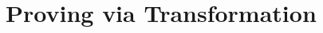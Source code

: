 
\chapter{Proving via Transformation}
\label{ch:proving-via-transformation}
\begin{comment}
We give details of the constructions and establish the soundness of
Algorithm~\ref{algorithm:overview}. Our goal is to establish the
following theorem:

\begin{theorem}
  Let $G^\fun{main} = \langle V, E, \cmd{cmd}^\fun{main} , \overline{\mathtt{u}}^\fun{main}, \overline{\mathtt{r}}^\fun{main},s,e \rangle$ be a control flow
  graph in $P$. If Algorithm~\ref{algorithm:overview} returns
  $\mathit{Pass}$, there is an inductive invariant $\Pi (G^\fun{main}, \TT)$
  such that $I_{\ell} \implies B_{\ell}$ for every $(\ell, \ell') \in
  E$ with $\cmd{cmd}^\fun{main} (\ell, \ell') = \mathtt{assert\ } B_{\ell}$.
  \label{theorem:soundness}
\end{theorem}
By Proposition~\ref{proposition:inductive-invariant}, it follows that
all assertions in $G^\fun{main}$ are satisfied.
Moreover, by the semantics of the 
$\mathtt{assert}$ command, all assertions in the program are satisfied.






\end{comment}